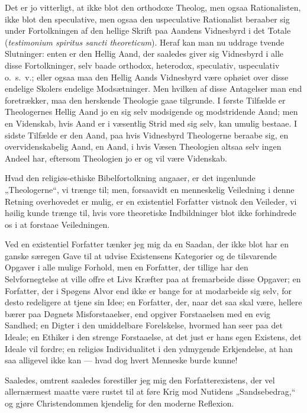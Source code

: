 \documentclass[12pt,a4paper]{book}
\newcommand{\opage}[1]{\marginnote{\footnotesize\textit{[#1]}}}
\begin{document}
Det er jo vitterligt, at ikke blot den orthodoxe Theolog, men ogsaa
Rationalisten, ikke blot den speculative, men ogsaa den uspeculative
Rationalist beraaber sig under Fortolkningen af den hellige Skrift paa
Aandens Vidnesbyrd i det Totale (\textit{testimonium spiritus sancti
theoreticum}). Heraf kan man nu uddrage tvende Slutninger: enten er den
Hellig Aand, der saaledes giver sig Vidnesbyrd i alle disse Fortolkninger,
selv baade orthodox, heterodox, speculativ, uspeculativ o.\ s.\ v.; eller
ogsaa maa den Hellig Aands Vidnesbyrd være ophøiet over disse endelige
Skolers endelige Modsætninger. Men hvilken af disse
\opage{79} Antagelser man end foretrækker, maa den herskende Theologie gaae tilgrunde. I
første Tilfælde er Theologernes Hellig Aand jo en sig selv modsigende og
modstridende Aand; men en Videnskab, hvis Aand er i væsentlig Strid med sig
selv, kan umulig bestaae. I sidste Tilfælde er den Aand, paa hvis Vidnesbyrd
Theologerne beraabe sig, en overvidenskabelig Aand, en Aand, i hvis Væsen
Theologien altsaa selv ingen Andeel har, eftersom Theologien jo er og vil
være Videnskab.

Hvad den religiøs-ethiske Bibelfortolkning angaaer, er det ingenlunde
„Theologerne“, vi trænge til; men, forsaavidt en menneskelig Veiledning i
denne Retning overhovedet er mulig, er en existentiel Forfatter vistnok den
Veileder, vi høilig kunde trænge til, hvis vore theoretiske Indbildninger
blot ikke forhindrede os i at forstaae Veiledningen.

Ved en existentiel Forfatter tænker jeg mig da en Saadan, der ikke blot har
en ganske særegen Gave til at udvise Existensens Kategorier og de tilsvarende
Opgaver i alle mulige Forhold, men en Forfatter, der tillige har den
Selvfornegtelse at ville offre et Livs Kræfter paa at fremarbeide disse
Opgaver; en Forfatter, der i Spøgens Alvor end ikke er bange for at
modarbeide sig selv, for desto redeligere at tjene sin Idee; en Forfatter,
der, naar det saa skal være, hellere bærer paa Døgnets Misforstaaelser, end
opgiver Forstaaelsen med en evig Sandhed; en Digter i den umiddelbare
Forelskelse, hvormed han seer paa det Ideale; en Ethiker i den strenge
Forstaaelse, at det just er hans egen Existens, det Ideale vil fordre; en
religiøs Individualitet i den ydmygende Erkjendelse, at han saa alligevel
ikke kan --- hvad dog hvert Menneske burde kunne!

Saaledes, omtrent saaledes forestiller jeg mig den Forfatterexistens, der vel
allernærmest maatte være rustet til at føre Krig mod Nutidens
„Sandsebedrag,“ og gjøre Christendommen kjendelig for den moderne Reflexion.
\end{document}
